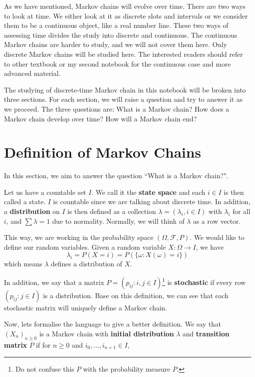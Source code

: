 \documentclass[11pt, a4paper, oneside]{book}
\theoremstyle{definition}
\begin{document}
\noindent As we have mentioned, Markov chains will evolve over time. There are two ways to look at time. We either look at it as discrete slots and intervals or we consider them to be a continuous object, like a real number line. These two ways of assessing time divides the study into discrete and continuous. The continuous Markov chains are harder to study, and we will not cover them here. Only discrete Markov chains will be studied here. The interested readers should refer to other textbook or my second notebook for the continuous case and more advanced material. 

\noindent The studying of discrete-time Markov chain in this notebook will be broken into three sections. For each section, we will raise a question and try to answer it as we proceed. The three questions are: What is a Markov chain? How does a Markov chain develop over time? How will a Markov chain end?

\section{Definition of Markov Chains}

\noindent In this section, we aim to answer the question ``What is a Markov chain?". 

\noindent Let us have a countable set $I$. We call it the \textbf{state space} and each $i \in I$ is then called a state. $I$ is countable since we are talking about discrete time. In addition, a \textbf{distribution} on $I$ is then defined as a collection $\lambda = (\lambda_i, i\in I)$ with $\lambda_i$ for all $i$, and $\sum \lambda = 1$ due to normality. Normally, we will think of $\lambda$ as a row vector. 

\noindent This way, we are working in the probability space $(\Omega, \mathcal{F}, P)$. We would like to define our random variables. Given a random variable $X: \Omega \to I$, we have \[
\lambda_i = P(X = i) = P(\{ \omega : X(\omega) = i\})
\]
which means $\lambda$ defines a distribution of $X$. 

\noindent In addition, we say that a matrix $P = (p_{ij} : i, j \in I)$\footnote{Do not confuse this $P$ with the probability measure $P$.} is \textbf{stochastic} if every row $(p_{ij} : j \in I)$ is a distribution. Base on this definition, we can see that each stochastic matrix will uniquely define a Markov chain. 

\noindent Now, lets formalise the language to give a better definition. We say that $(X_n)_{n \ge 0}$ is a Markov chain with \textbf{initial distribution} $\lambda$ and \textbf{transition matrix} $P$ if for $n \ge 0$ and $i_0, \dots, i_{n+1} \in I$, 
\end{document}
